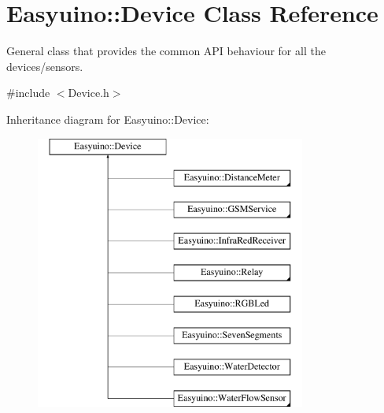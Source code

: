 \hypertarget{class_easyuino_1_1_device}{}\section{Easyuino\+:\+:Device Class Reference}
\label{class_easyuino_1_1_device}


General class that provides the common A\+PI behaviour for all the devices/sensors.  




{\ttfamily \#include $<$Device.\+h$>$}

Inheritance diagram for Easyuino\+:\+:Device\+:\begin{figure}[H]
\begin{center}
\leavevmode
\includegraphics[height=9.000000cm]{class_easyuino_1_1_device}
\end{center}
\end{figure}
